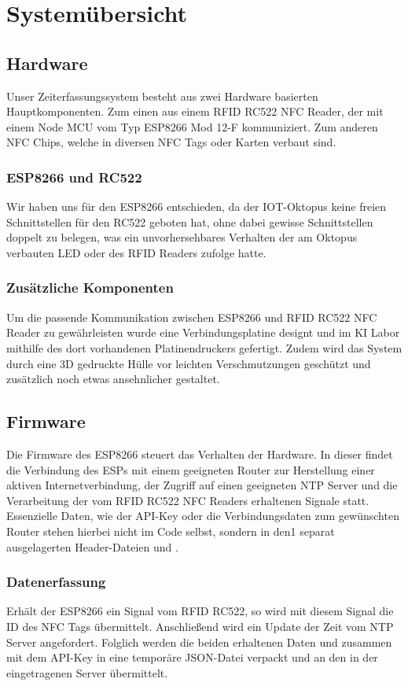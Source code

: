\documentclass[../main.tex]{subfiles}
\begin{document}
\section{Systemübersicht}

\subsection{Hardware}
Unser Zeiterfassungssystem besteht aus zwei Hardware basierten Hauptkomponenten. Zum einen aus einem RFID RC522 NFC Reader, der mit einem Node MCU vom Typ ESP8266 Mod 12-F kommuniziert. Zum anderen NFC Chips, welche in diversen NFC Tags oder Karten verbaut sind.

\subsubsection{ESP8266 und RC522}
Wir haben uns für den ESP8266 entschieden, da der IOT-Oktopus keine freien Schnittstellen für den RC522 geboten hat, ohne dabei gewisse Schnittstellen doppelt zu belegen, was ein unvorhersehbares Verhalten der am Oktopus verbauten LED oder des RFID Readers zufolge hatte.

\subsubsection{Zusätzliche Komponenten}
Um die passende Kommunikation zwischen ESP8266 und RFID RC522 NFC Reader zu gewährleisten wurde eine Verbindungsplatine designt und im KI Labor mithilfe des dort vorhandenen Platinendruckers gefertigt. Zudem wird das System durch eine 3D gedruckte Hülle vor leichten Verschmutzungen geschützt und zusätzlich noch etwas ansehnlicher gestaltet. 



\subsection{Firmware}
Die Firmware des ESP8266 steuert das Verhalten der Hardware. In dieser findet die Verbindung des ESPs mit einem geeigneten Router zur Herstellung einer aktiven Internetverbindung, der Zugriff auf einen geeigneten NTP Server und die Verarbeitung der vom RFID RC522 NFC Readers erhaltenen Signale statt. Essenzielle Daten, wie der API-Key oder die Verbindungsdaten zum gewünschten Router stehen hierbei nicht im Code selbst, sondern in den1 separat ausgelagerten Header-Dateien  und .

\subsubsection{Datenerfassung}
Erhält der ESP8266 ein Signal vom RFID RC522, so wird mit diesem Signal die ID des NFC Tags übermittelt. Anschließend wird ein Update der Zeit vom NTP Server angefordert. Folglich werden die beiden erhaltenen Daten  und  zusammen mit dem API-Key in eine temporäre JSON-Datei verpackt und an den in der  eingetragenen Server übermittelt. 
\end{document}
